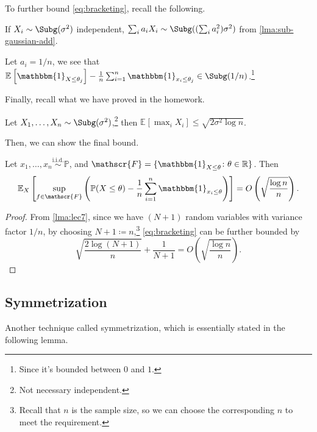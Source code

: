 To further bound \autoref{eq:bracketing}, recall the following.

\begin{prev}
  If \(X_i \sim \Subg(\sigma ^2) \) independent, \(\sum_{i} a_i X_i \sim \Subg((\sum_{i} a_i^2) \sigma ^2) \) from \autoref{lma:sub-gaussian-add}.
\end{prev}

\begin{remark}
  Let \(a_i = 1/n\), we see that \(\mathbb{E}_{}\left[\mathbbm{1}_{X \leq \theta _j}\right] - \frac{1}{n} \sum_{i=1}^{n} \mathbbm{1}_{x_i \leq \theta _j} \in \Subg(1 / n) \).\footnote{Since it's bounded between \(0\) and \(1\).}
\end{remark}

Finally, recall what we have proved in the homework.

\begin{lemma}\label{lma:lec7}
  Let \(X_1, \dots , X_n \sim \Subg(\sigma ^{2} ) \),\footnote{Not necessary independent.} then \(\mathbb{E}_{}\left[\max _i X_i \right] \leq \sqrt{2 \sigma ^{2} \log n}\).
\end{lemma}

Then, we can show the final bound.

\begin{proposition}[Bracketing]\label{prop:bracketing}
  Let \(x_1, \dots , x_n \overset{\text{i.i.d.} }{\sim } \mathbb{P} \), and \(\mathscr{F} = \{ \mathbbm{1}_{X \leq \theta} \colon \theta \in \mathbb{R} \} \). Then
  \[
    \mathbb{E}_{X}\left[ \sup _{f\in \mathscr{F} } \left( \mathbb{P} (X \leq \theta ) - \frac{1}{n}\sum_{i=1}^{n} \mathbbm{1}_{x_i \leq \theta } \right) \right] = O\left( \sqrt{\frac{\log n}{n}}  \right).
  \]
\end{proposition}
\begin{proof}
  From \autoref{lma:lec7}, since we have \((N+1)\) random variables with variance factor \(1 / n\), by choosing \(N+1 \coloneqq n\),\footnote{Recall that \(n\) is the sample size, so we can choose the corresponding \(n\) to meet the requirement.} \autoref{eq:bracketing} can be further bounded by
  \[
    \sqrt{\frac{2 \log (N+1)}{n}} + \frac{1}{N+1} = O\left( \sqrt{\frac{\log n}{n}}  \right).
  \]
\end{proof}
\subsection{Symmetrization}
Another technique called symmetrization, which is essentially stated in the following lemma.


